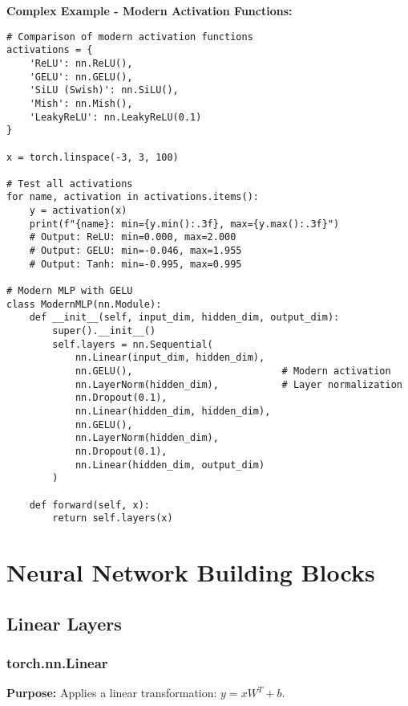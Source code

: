 \documentclass[11pt,a4paper]{book}
\begin{document}
\textbf{Complex Example - Modern Activation Functions:}
\begin{verbatim}
# Comparison of modern activation functions
activations = {
    'ReLU': nn.ReLU(),
    'GELU': nn.GELU(),
    'SiLU (Swish)': nn.SiLU(),
    'Mish': nn.Mish(),
    'LeakyReLU': nn.LeakyReLU(0.1)
}

x = torch.linspace(-3, 3, 100)

# Test all activations
for name, activation in activations.items():
    y = activation(x)
    print(f"{name}: min={y.min():.3f}, max={y.max():.3f}")
    # Output: ReLU: min=0.000, max=2.000
    # Output: GELU: min=-0.046, max=1.955
    # Output: Tanh: min=-0.995, max=0.995

# Modern MLP with GELU
class ModernMLP(nn.Module):
    def __init__(self, input_dim, hidden_dim, output_dim):
        super().__init__()
        self.layers = nn.Sequential(
            nn.Linear(input_dim, hidden_dim),
            nn.GELU(),                          # Modern activation
            nn.LayerNorm(hidden_dim),           # Layer normalization
            nn.Dropout(0.1),
            nn.Linear(hidden_dim, hidden_dim),
            nn.GELU(),
            nn.LayerNorm(hidden_dim),
            nn.Dropout(0.1),
            nn.Linear(hidden_dim, output_dim)
        )
    
    def forward(self, x):
        return self.layers(x)
\end{verbatim}

\chapter{Neural Network Building Blocks}

\section{Linear Layers}

\subsection{torch.nn.Linear}

\textbf{Purpose:} Applies a linear transformation: $y = xW^T + b$.
\end{document}
